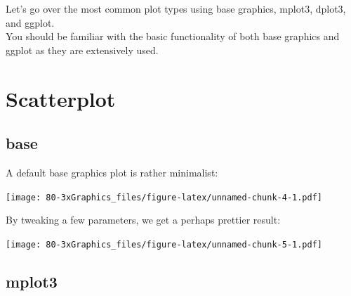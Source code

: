 \documentclass[
]{book}
\newenvironment{Shaded}{\begin{snugshade}}{\end{snugshade}}
\newcommand{\AttributeTok}[1]{\textcolor[rgb]{0.77,0.63,0.00}{#1}}
\newcommand{\DecValTok}[1]{\textcolor[rgb]{0.00,0.00,0.81}{#1}}
\newcommand{\FloatTok}[1]{\textcolor[rgb]{0.00,0.00,0.81}{#1}}
\newcommand{\FunctionTok}[1]{\textcolor[rgb]{0.00,0.00,0.00}{#1}}
\newcommand{\NormalTok}[1]{#1}
\newcommand{\SpecialCharTok}[1]{\textcolor[rgb]{0.00,0.00,0.00}{#1}}
\newcommand{\StringTok}[1]{\textcolor[rgb]{0.31,0.60,0.02}{#1}}
\begin{document}
Let's go over the most common plot types using base graphics, mplot3, dplot3, and ggplot.\\
You should be familiar with the basic functionality of both base graphics and ggplot as they are extensively used.

\hypertarget{scatterplot}{%
\section{Scatterplot}\label{scatterplot}}

\hypertarget{base-2}{%
\subsection{base}\label{base-2}}

A default base graphics plot is rather minimalist:

\begin{Shaded}
\end{Shaded}

\texttt{[image: 80-3xGraphics\_files/figure-latex/unnamed-chunk-4-1.pdf]}

By tweaking a few parameters, we get a perhaps prettier result:

\begin{Shaded}
\end{Shaded}

\texttt{[image: 80-3xGraphics\_files/figure-latex/unnamed-chunk-5-1.pdf]}

\hypertarget{mplot3}{%
\subsection{\texorpdfstring{\textbf{mplot3}}{mplot3}}\label{mplot3}}
\end{document}

